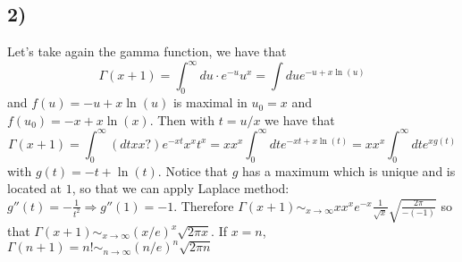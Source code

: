 \documentclass[10pt,a4paper]{book}
\begin{document}
\subsection*{2)}

Let's take again the gamma function, we have that 
$$\Gamma(x+1)=\int_0^{\infty}du\cdot e^{-u} u^x=\int du e^{-u+x\ln(u)}$$
and $f(u)=-u+x\ln(u)$ is maximal in $u_0=x$ and $f(u_0)=-x+x\ln(x)$. Then with $t=u/x$ we have that 
$$\Gamma(x+1)=\int_0^{\infty}(dt xx?)e^{-xt}x^xt^x=xx^x\int_0^{\infty} dt e^{-xt+x\ln(t)}=xx^x\int_0^{\infty} dt e^{xg(t)}$$ with $g(t)=-t+\ln(t)$. Notice that $g$ has a maximum which is unique and is located at $1$, so that we can apply Laplace method:\\
$g''(t)=-\frac{1}{t^2}\Rightarrow g''(1)=-1$. Therefore $\Gamma(x+1)\sim_{x\to\infty} xx^xe^{-x}\frac{1}{\sqrt{x}}\sqrt{\frac{2\pi}{-(-1)}}$ so that $\Gamma(x+1)\sim_{x\to \infty} (x/e)^x\sqrt{2\pi x}$. If $x=n$, $\Gamma(n+1)=n!\sim_{n\to\infty} (n/e)^n\sqrt{2\pi n}$
\end{document}

